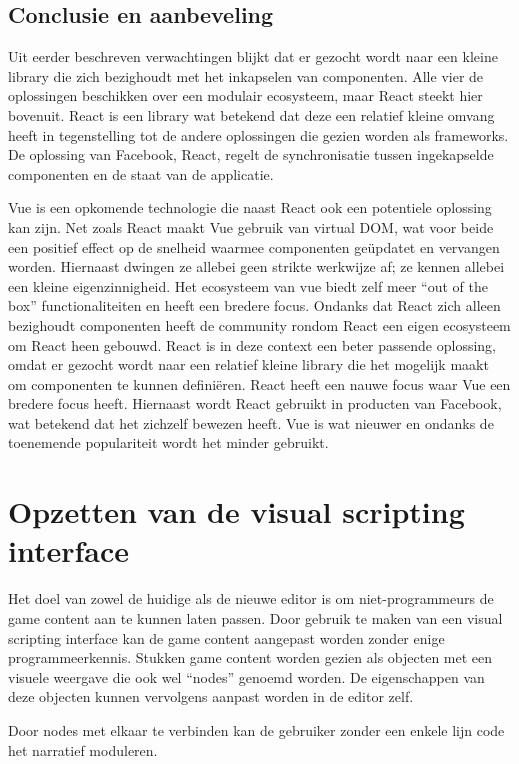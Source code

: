 \subsection{Conclusie en aanbeveling}
Uit eerder beschreven verwachtingen blijkt dat er gezocht wordt naar een kleine library die zich bezighoudt met het inkapselen van componenten. Alle vier de oplossingen beschikken over een modulair ecosysteem, maar React steekt hier bovenuit. React is een library wat betekend dat deze een relatief kleine omvang heeft in tegenstelling tot de andere oplossingen die gezien worden als frameworks. De oplossing van Facebook, React, regelt de synchronisatie tussen ingekapselde componenten en de staat van de applicatie.

Vue is een opkomende technologie die naast React ook een potentiele oplossing kan zijn. Net zoals React maakt Vue gebruik van virtual DOM, wat voor beide een positief effect op de snelheid waarmee componenten geüpdatet en vervangen worden. Hiernaast dwingen ze allebei geen strikte werkwijze af; ze kennen allebei een kleine eigenzinnigheid. Het ecosysteem van vue biedt zelf meer “out of the box” functionaliteiten en heeft een bredere focus. Ondanks dat React zich alleen bezighoudt componenten heeft de community rondom React een eigen ecosysteem om React heen gebouwd.
React is in deze context een beter passende oplossing, omdat er gezocht wordt naar een relatief kleine library die het mogelijk maakt om componenten te kunnen definiëren. React heeft een nauwe focus waar Vue een bredere focus heeft. Hiernaast wordt React gebruikt in producten van Facebook, wat betekend dat het zichzelf bewezen heeft. Vue is wat nieuwer en ondanks de toenemende populariteit wordt het minder gebruikt.

\section{Opzetten van de visual scripting interface}
Het doel van zowel de huidige als de nieuwe editor is om niet-programmeurs de game content aan te kunnen laten passen. Door gebruik te maken van een visual scripting interface kan de game content aangepast worden zonder enige programmeerkennis\cite{VisualScripting}. Stukken game content worden gezien als objecten met een visuele weergave die ook wel “nodes” genoemd worden. De eigenschappen van deze objecten kunnen vervolgens aanpast worden in de editor zelf.

Door nodes met elkaar te verbinden kan de gebruiker zonder een enkele lijn code het narratief moduleren.

